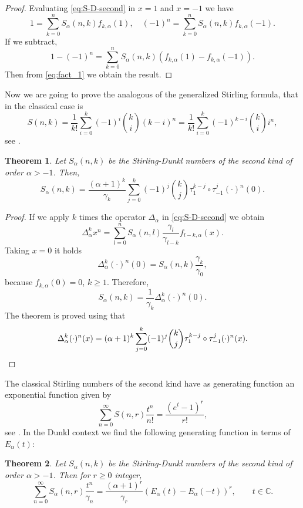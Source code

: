 \documentclass[11pt,a4paper]{article}
\theoremstyle{plain}
\newtheorem{theorem}{Theorem}[section]
\theoremstyle{remark}
\newcommand{\Ea}{E_{\alpha}}
\newcommand{\CC}{\mathbb{C}}
\begin{document}
\begin{proof}
Evaluating \eqref{eq:S-D-second} in $x=1$ and $x=-1$ we have
\[
  1 = \sum_{k=0}^n S_{\alpha}(n,k)f_{k,\alpha}(1),
  \quad (-1)^n = \sum_{k=0}^n S_{\alpha}(n,k)f_{k,\alpha}(-1).
\]
If we subtract, 
\[
  1-(-1)^n = \sum_{k=0}^n S_{\alpha}(n,k)(f_{k,\alpha}(1)-f_{k,\alpha}(-1)).
\]
Then from \eqref{eq:fact_1} we obtain the result.
\end{proof}

Now we are going to prove the analogous of the generalized Stirling formula, that in the classical case is  
\[
S(n,k) = \frac{1}{k!} \sum_{i=0}^k (-1)^i \binom{k}{i}(k-i)^n
= \frac{1}{k!} \sum_{i=0}^k (-1)^{k-i} \binom{k}{i}i^n,
\]
see \cite[26.8.6]{Br-NIST}.



\begin{theorem}
\label{teo:S-D-formula} 
Let $S_{\alpha}(n,k)$ be the Stirling-Dunkl numbers of the second kind of order $\alpha>-1$. Then,
\begin{equation}
\label{eq:S-D-formula}
  S_{\alpha}(n,k) = \frac{(\alpha+1)^k}{\gamma_k}
  \sum_{j=0}^k (-1)^j \binom{k}{j} \tau_1^{k-j}\circ\tau_{-1}^{j}(\cdot)^n(0).
\end{equation}
\end{theorem}

\begin{proof}
If we apply $k$ times the operator $\Delta_{\alpha}$ in \eqref{eq:S-D-second} we obtain
\[
  \Delta_{\alpha}^k x^n 
  = \sum_{l=0}^n S_{\alpha}(n,l) \frac{\gamma_l}{\gamma_{l-k}} f_{l-k,\alpha}(x).
\]
Taking $x=0$ it holds
\[
  \Delta_{\alpha}^k(\cdot)^n(0) = S_{\alpha}(n,k) \frac{\gamma_k}{\gamma_0},
\]
because $f_{k,\alpha}(0)=0$, $k\ge 1$.
Therefore,
\[
  S_{\alpha}(n,k) = \frac{1}{\gamma_k}\Delta_{\alpha}^k(\cdot)^n(0).
\]
The theorem is proved using that 
\[
  \Delta_{\alpha}^k(\cdot)^n(x) 
  = (\alpha+1)^k \sum_{j=0}^{k} (-1)^j\binom{k}{j} \tau_1^{k-j}\circ\tau_{-1}^j(\cdot)^n(x).
\qedhere
\]
\end{proof}

The classical Stirling numbers of the second kind have as generating function an exponential function given by
\[
  \sum_{n=0}^{\infty} S(n,r) \frac{t^n}{n!} = \frac{(e^t-1)^r}{r!},
\]
see \cite[26.8.12]{Br-NIST}.
In the Dunkl context we find the following generating function in terms of~$\Ea(t)$:


\begin{theorem}
\label{teo:S-gen-second} 
Let $S_{\alpha}(n,k)$ be the Stirling-Dunkl numbers of the second kind of order $\alpha>-1$. Then for $r\ge 0$ integer,
\begin{equation}
\label{eq:S-gen-second}
  \sum_{n=0}^{\infty} S_{\alpha}(n,r) \frac{t^n}{\gamma_n}
  = \frac{(\alpha+1)^r}{\gamma_r}(\Ea(t)-\Ea(-t))^r,
  \qquad t\in\CC.
\end{equation}
\end{theorem}
\end{document}
